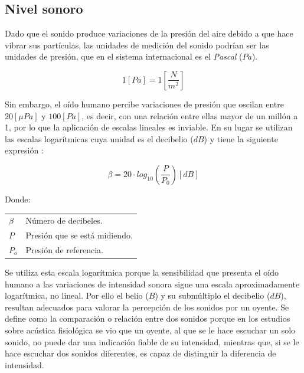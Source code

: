 \documentclass[letter,11pt]{article}
\makeatletter
\newenvironment{conditions}
  {\par\vspace{\abovedisplayskip}\noindent\begin{tabular}{>{$}l<{$} @{${}={}$} l}}
  {\end{tabular}\par\vspace{\belowdisplayskip}}
\makeatother
\begin{document}
\subsection{Nivel sonoro}

Dado que el sonido produce variaciones de la presión del aire debido a que hace
vibrar sus partículas, las unidades de medición del sonido podrían ser las
unidades de presión, que en el sistema internacional es el \emph{Pascal} ($Pa$).

\begin{equation*}
    1 [Pa] = 1 \left[\frac{N}{m^2}\right]
\end{equation*}
\vspace{0.10cm}

Sin embargo, el oído humano percibe variaciones de presión que oscilan entre 
$20 [\mu Pa]$ y $100 [Pa]$, es decir, con una relación entre ellas mayor de un
millón a 1, por lo que la aplicación de escalas lineales es inviable. En su
lugar se utilizan las escalas logarítmicas cuya unidad es el decibelio ($dB$) y
tiene la siguiente expresión \cite{SUPERINTENDENCIA}:

\begin{equation*}
    \beta = 20\cdot log_{10}\left(\frac{P}{P_0}\right) [dB]
\end{equation*}
\vspace{0.10cm}

Donde:

\begin{conditions}
\beta & Número de decibeles. \\
P     & Presión que se está midiendo. \\
P_o   & Presión de referencia. \\
\end{conditions}

Se utiliza esta escala logarítmica porque la sensibilidad que presenta el oído
humano a las variaciones de intensidad sonora sigue una escala aproximadamente
logarítmica, no lineal. Por ello el belio ($B$) y su submúltiplo el decibelio
($dB$), resultan adecuados para valorar la percepción de los sonidos por un
oyente. Se define como la comparación o relación entre dos sonidos porque en los
estudios sobre acústica fisiológica se vio que un oyente, al que se le hace
escuchar un solo sonido, no puede dar una indicación fiable de su intensidad,
mientras que, si se le hace escuchar dos sonidos diferentes, es capaz de
distinguir la diferencia de intensidad.
\\
\end{document}
